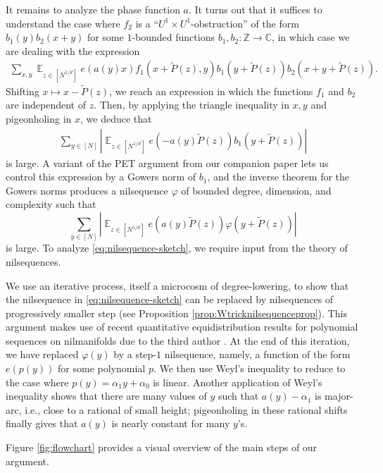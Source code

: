 \documentclass[11pt]{amsart}
\theoremstyle{definition}
\DeclareMathOperator*{\E}{\mathbb{E}}
\newcommand{\C}{{\mathbb C}}
\newcommand{\Z}{{\mathbb Z}}
\newcommand{\abs}[1]{\mathopen{}\left| #1\mathclose{}\right|}
\begin{document}
It remains to analyze the phase function $a$.  It turns out that it suffices to understand the case where $f_2$ is a ``$U^1 \times U^1$-obstruction'' of the form $b_1(y)b_2(x+y)$ for some $1$-bounded functions $b_1,b_2:\Z \to \C$, in which case we are dealing with the expression
\begin{align*}
    \sum_{x,y} \E_{z \in [N^{1/d}]}e(a(y)x)f_1(x+\widetilde P(z),y)b_1(y+\widetilde P(z))b_2(x+y+\widetilde P(z)).
\end{align*}
Shifting $x\mapsto x-\widetilde P(z)$, we reach an expression in which the functions $f_1$ and $b_2$ are independent of $z$. Then, by applying the triangle inequality in $x,y$ and pigeonholing in $x$, we deduce that
\begin{align*}
    \sum_{y \in [N]} \abs{\E_{z \in [N^{1/d}]} e(-a(y)\widetilde P(z)) b_1(y+\widetilde P(z))}
\end{align*}
is large.  A variant of the PET argument from our companion paper \cite{KKL24a} lets us control this expression by a Gowers norm of $b_1$, and the inverse theorem for the Gowers norms produces a nilsequence $\varphi$ of bounded degree, dimension, and complexity such that
\begin{equation}\label{eq:nilsequence-sketch}
\sum_{y \in [N]} \abs{\E_{z \in [N^{1/d}]} e(a(y)\widetilde P(z)) \varphi(y+\widetilde P(z))}
\end{equation}
is large.  To analyze \eqref{eq:nilsequence-sketch}, we require input from the theory of nilsequences.

We use an iterative process, itself a microcosm of degree-lowering, to show that the nilsequence in \eqref{eq:nilsequence-sketch} can be replaced by nilsequences of progressively smaller step (see Proposition \ref{prop:Wtricknilsequenceprop}).  This argument makes use of recent quantitative equidistribution results for polynomial sequences on nilmanifolds due to the third author \cite{Leng23b}.  At the end of this iteration, we have replaced $\varphi(y)$ by a step-$1$ nilsequence, namely, a function of the form $e(p(y))$ for some polynomial $p$.  We then use Weyl's inequality to reduce to the case where $p(y)=\alpha_1 y+\alpha_0$ is linear.  Another application of Weyl's inequality shows that there are many values of $y$ such that $a(y)-\alpha_1$ is major-arc, i.e., close to a rational of small height; pigeonholing in these rational shifts finally gives that $a(y)$ is nearly constant for many $y$'s.

Figure \ref{fig:flowchart} provides a visual overview of the main steps of our argument.
\end{document}
